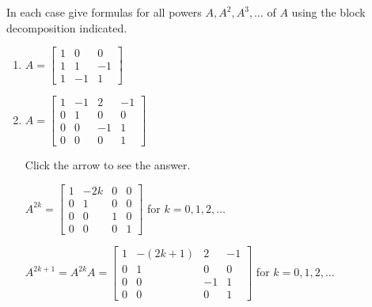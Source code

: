 \documentclass{ximera}
\begin{document}
\begin{problem}\label{prob:block_powers}
In each case give formulas for all powers $A, A^{2}, A^{3}, \dots$ of $A$ using the block decomposition indicated.


\begin{enumerate}
\item
$A = \left[ \begin{array}{r|rr}
1 & 0 & 0 \\
\hline
1 & 1  & -1\\
1 & -1 & 1
\end{array} \right]
$


\item
$A = \left[ \begin{array}{rr|rr}
1 & -1 & 2 & -1 \\
0 & 1 & 0 & 0 \\
\hline
0 & 0 & -1 & 1 \\
0 & 0 & 0 & 1
\end{array} \right]
$

Click the arrow to see the answer.
\begin{expandable}{}{}
$
A^{2k} = \left[ \begin{array}{rc|rr}
1 & -2k & 0 & 0 \\
0 & 1 & 0 & 0 \\
\hline
0 & 0 & 1 & 0 \\
0 & 0 & 0 & 1
\end{array} \right]$ for $k = 0, 1, 2, \dots$

$A^{2k + 1} = A^{2k}A = \left[ \begin{array}{rc|rr}
1 & -(2k + 1) & 2 & -1 \\
0 & 1 & 0 & 0 \\
\hline
0 & 0 & -1 & 1 \\
0 & 0 & 0 & 1
\end{array} \right]$ for $k = 0, 1, 2, \dots$
\end{expandable}
\end{enumerate}
\end{problem}
\end{document}
